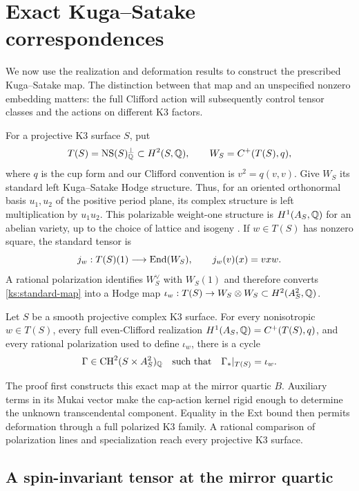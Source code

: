 \section{Exact Kuga--Satake correspondences}
\label{sec:exactks}

We now use the realization and deformation results to construct the
prescribed Kuga--Satake map.  The distinction between that map and an
unspecified nonzero embedding matters: the full Clifford action will
subsequently control tensor classes and the actions on different K3
factors.

For a projective K3 surface $S$, put
\[
 T(S)=\operatorname{NS}(S)_{\mathbb Q}^{\perp}\subset H^2(S,\mathbb Q),
 \qquad W_S=C^+(T(S),q),
\]
where $q$ is the cup form and our Clifford convention is
$v^2=q(v,v)$.  Give $W_S$ its standard left Kuga--Satake Hodge
structure.  Thus, for an oriented orthonormal basis $u_1,u_2$ of
the positive period plane, its complex structure is left
multiplication by $u_1u_2$.  This polarizable weight-one structure
is $H^1(A_S,\mathbb Q)$ for an abelian variety, up to the choice of lattice
and isogeny \cite{KugaSatake,DeligneK3,VanGeemenKS}.  If
$w\in T(S)$ has nonzero square, the standard tensor is
\begin{equation}
 \label{ks:standard-map}
 j_w:T(S)(1)\longrightarrow\operatorname{End}(W_S),
 \qquad j_w(v)(x)=vxw.
\end{equation}
A rational polarization identifies $W_S^\vee$ with $W_S(1)$ and
therefore converts \eqref{ks:standard-map} into a Hodge map
$\iota_w:T(S)\to W_S\otimes W_S\subset H^2(A_S^2,\mathbb Q)$.

\begin{theorem}
 \label{thm:exact-ks}
Let $S$ be a smooth projective complex K3 surface.  For every
nonisotropic $w\in T(S)$, every full even-Clifford realization
$H^1(A_S,\mathbb Q)=C^+(T(S),q)$, and every rational polarization used
to define $\iota_w$, there is a cycle
\[
 \Gamma\in\operatorname{CH}^2(S\times A_S^2)_{\mathbb Q}
 \quad\text{such that}\quad
 \Gamma_*|_{T(S)}=\iota_w.
\]
\end{theorem}

The proof first constructs this exact map at the mirror quartic
$B$.  Auxiliary terms in its Mukai vector make the cap-action
kernel rigid enough to determine the unknown transcendental
component.  Equality in the Ext bound then permits deformation
through a full polarized K3 family.  A rational comparison of
polarization lines and specialization reach every projective K3
surface.

\subsection{A spin-invariant tensor at the mirror quartic}
\label{ks:construction}

